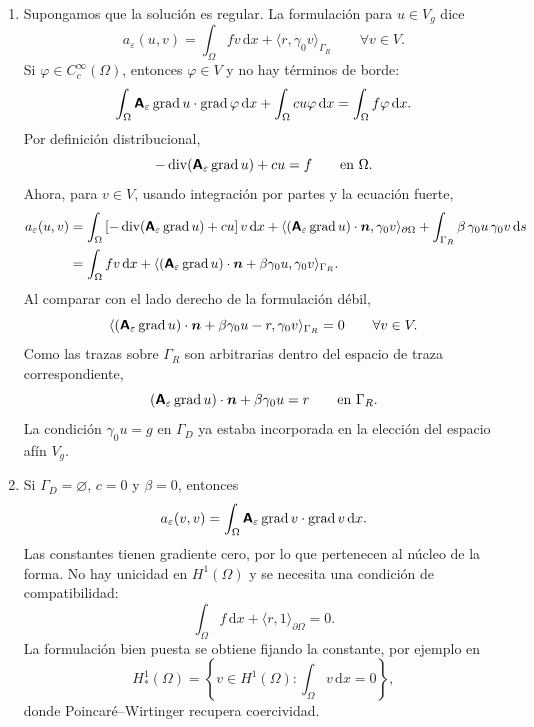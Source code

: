\documentclass[11pt]{article}
\def\mat   #1{\mbox{\boldmath $\mathsf #1$}}
\def\vec   #1{\mbox{\boldmath $#1$}{}}
\DeclareMathOperator{\grad}{grad}
\DeclareMathOperator{\dive}{div}
\def\dx{\mbox{\(\,\mathrm{d}x\)}}
\def\ds{\mbox{\(\,\mathrm{d}s\)}}
\begin{document}
\begin{enumerate}[label=\textbf{\arabic*.}, leftmargin=*]
\begin{enumerate}[label=(\alph*)]
        \item Supongamos que la solución es regular. La formulación para $u\in V_g$ dice
        \[
            a_\varepsilon(u,v)=
            \int_\Omega fv\dx+\langle r,\gamma_0v\rangle_{\Gamma_R}
            \qquad\forall v\in V.
        \]
        Si $\varphi\in C_c^\infty(\Omega)$, entonces $\varphi\in V$ y no hay términos de borde:
        \[
            \int_\Omega \mat A_\varepsilon\grad u\cdot\grad\varphi\dx
            +\int_\Omega cu\varphi\dx
            =
            \int_\Omega f\varphi\dx.
        \]
        Por definición distribucional,
        \[
            -\dive(\mat A_\varepsilon\grad u)+cu=f
            \qquad\text{en }\Omega.
        \]
        Ahora, para $v\in V$, usando integración por partes y la ecuación fuerte,
        \begin{align*}
            a_\varepsilon(u,v)
            &=
            \int_\Omega\left[-\dive(\mat A_\varepsilon\grad u)+cu\right]v\dx
            +\langle(\mat A_\varepsilon\grad u)\cdot\vec n,\gamma_0v\rangle_{\partial\Omega}
            +\int_{\Gamma_R}\beta\,\gamma_0u\,\gamma_0v\ds\\
            &=
            \int_\Omega fv\dx
            +\langle(\mat A_\varepsilon\grad u)\cdot\vec n+\beta\gamma_0u,\gamma_0v\rangle_{\Gamma_R}.
        \end{align*}
        Al comparar con el lado derecho de la formulación débil,
        \[
            \langle(\mat A_\varepsilon\grad u)\cdot\vec n+\beta\gamma_0u-r,\gamma_0v\rangle_{\Gamma_R}=0
            \qquad\forall v\in V.
        \]
        Como las trazas sobre $\Gamma_R$ son arbitrarias dentro del espacio de traza correspondiente,
        \[
            (\mat A_\varepsilon\grad u)\cdot\vec n+\beta\gamma_0u=r
            \qquad\text{en }\Gamma_R.
        \]
        La condición $\gamma_0u=g$ en $\Gamma_D$ ya estaba incorporada en la elección del espacio afín $V_g$.

        \item Si $\Gamma_D=\varnothing$, $c=0$ y $\beta=0$, entonces
        \[
            a_\varepsilon(v,v)=\int_\Omega \mat A_\varepsilon\grad v\cdot\grad v\dx.
        \]
        Las constantes tienen gradiente cero, por lo que pertenecen al núcleo de la forma. No hay unicidad en $H^1(\Omega)$ y se necesita una condición de compatibilidad:
        \[
            \int_\Omega f\dx+\langle r,1\rangle_{\partial\Omega}=0.
        \]
        La formulación bien puesta se obtiene fijando la constante, por ejemplo en
        \[
            H^1_\ast(\Omega)=\left\{v\in H^1(\Omega):\int_\Omega v\dx=0\right\},
        \]
        donde Poincaré--Wirtinger recupera coercividad.
    \end{enumerate}

\end{enumerate}
\end{document}
